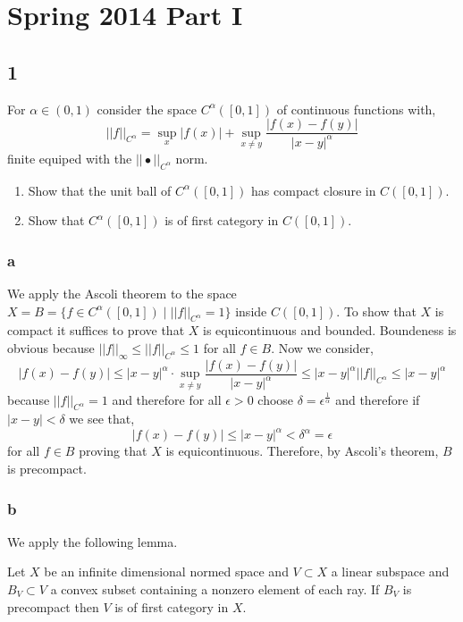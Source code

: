 \documentclass[12pt]{article}
\begin{document}
\section{Spring 2014 Part I}

\subsection{1}

\begin{exercise}
For $\alpha \in (0,1)$ consider the space $C^\alpha([0,1])$ of continuous functions with,
\[ || f ||_{C^\alpha} = \sup_x | f(x) | + \sup_{x \neq y} \frac{|f(x) - f(y)|}{|x - y|^\alpha} \]
finite equiped with the $|| \bullet ||_{C^\alpha}$ norm.
\begin{enumerate}
\item Show that the unit ball of $C^\alpha([0,1])$ has compact closure in $C([0,1])$.
\item Show that $C^\alpha([0,1])$ is of first category in $C([0,1])$.
\end{enumerate}
\end{exercise}

\subsubsection{a}

We apply the Ascoli theorem to the space $X = B = \{ f \in C^\alpha([0,1]) \mid || f ||_{C^\alpha} = 1 \}$ inside $C([0,1])$. To show that $X$ is compact it suffices to prove that $X$ is equicontinuous and bounded. Boundeness is obvious because $|| f ||_{\infty} \le || f ||_{C^\alpha} \le 1$ for all $f \in B$. Now we consider,
\[ | f(x) - f(y) | \le | x - y |^\alpha \cdot \sup_{x \neq y} \frac{|f(x) - f(y)|}{|x - y|^\alpha} \le | x  - y|^\alpha || f ||_{C^\alpha} \le | x - y |^\alpha \]
because $|| f ||_{C^\alpha} = 1$ and therefore for all $\epsilon > 0$ choose $\delta = \epsilon^{\frac{1}{\alpha}}$ and therefore if $| x - y | < \delta$ we see that,
\[ | f(x) - f(y) | \le | x - y |^\alpha < \delta^\alpha = \epsilon \]
for all $f \in B$ proving that $X$ is equicontinuous. Therefore, by Ascoli's theorem, $B$ is precompact.

\subsubsection{b}

We apply the following lemma.

\begin{lemma}
Let $X$ be an infinite dimensional normed space and $V \subset X$ a linear subspace and $B_V \subset V$ a convex subset containing a nonzero element of each ray. If $B_V$ is precompact then $V$ is of first category in $X$.
\end{lemma}
\end{document}
